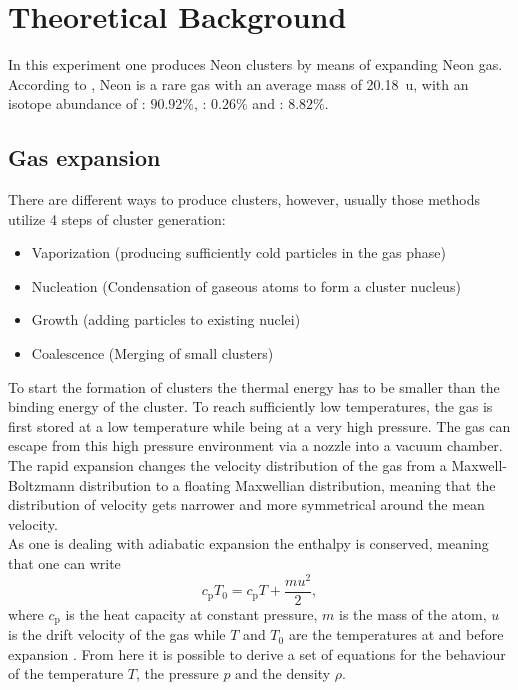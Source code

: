 \documentclass[a4paper,10pt]{article}
\begin{document}
\section{Theoretical Background}
In this experiment one produces Neon clusters by means of expanding Neon gas. According to \cite{script}, Neon is a rare gas with an average mass of \SI{20.18}{\atomicmassunit}, with an isotope abundance of : $90.92\%$, : $0.26\%$ and : $8.82\%$.

\subsection{Gas expansion}
There are different ways to produce clusters, however, usually those methods utilize 4 steps of cluster generation:
\begin{itemize}
	\item Vaporization (producing sufficiently cold particles in the gas phase)
	\item Nucleation (Condensation of gaseous atoms to form a cluster nucleus)
	\item Growth (adding particles to existing nuclei)
	\item Coalescence (Merging of small clusters)
\end{itemize}
To start the formation of clusters the thermal energy has to be smaller than the binding energy of the cluster. To reach sufficiently low temperatures, the gas is first stored at a low temperature while being at a very high pressure. The gas can escape from this high pressure environment via a nozzle into a vacuum chamber. The rapid expansion changes the velocity distribution of the gas from a Maxwell-Boltzmann distribution to a floating Maxwellian distribution, meaning that the distribution of velocity gets narrower and more symmetrical around the mean velocity. \\
As one is dealing with adiabatic expansion the enthalpy is conserved, meaning that one can write
\begin{equation}
	c_\mathrm{p} T_0 = c_\mathrm{p} T + \frac{m u^2}{2},
\end{equation}
where $c_\mathrm{p}$ is the heat capacity at constant pressure, $m$ is the mass of the atom, $u$ is the drift velocity of the gas while $T$ and $T_0$ are the temperatures at and before expansion \cite{script}. From here it is possible to derive a set of equations for the behaviour of the temperature $T$, the pressure $p$ and the density $\rho$.
\end{document}
